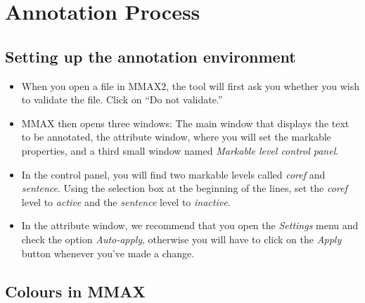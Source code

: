 \documentclass[a4paper]{article}
\begin{document}
% 
% 
% 



\section{\label{sec:mmax}Annotation Process}

\subsection{Setting up the annotation environment}

\begin{itemize}
\item When you open a file in MMAX2, the tool will first ask you whether you
wish to validate the file. Click on ``Do not validate.''
\item MMAX then opens three windows: The main window that displays the text to
be annotated, the attribute window, where you will set the markable properties,
and a third small window named
\emph{Markable level control panel}.
\item In the control panel, you will find two markable levels called
\emph{coref} and \emph{sentence}. Using the selection box at the beginning of
the lines, set the \emph{coref} level to \emph{active} and the \emph{sentence}
level to \emph{inactive}.
\item In the attribute window, we recommend that you open the \emph{Settings}
menu and check the option \emph{Auto-apply}, otherwise you will have to click on
the \emph{Apply} button whenever you've made a change.
\end{itemize}

\subsection{Colours in MMAX}
\end{document}
